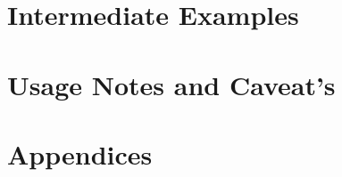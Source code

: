 \documentclass{book}
\begin{document}

\part{Intermediate Examples}



\part{Usage Notes and Caveat's}

%

\backmatter
\part{Appendices}
\appendix
\begin{appendix}


%
\end{appendix}

\printindex
\end{document}
